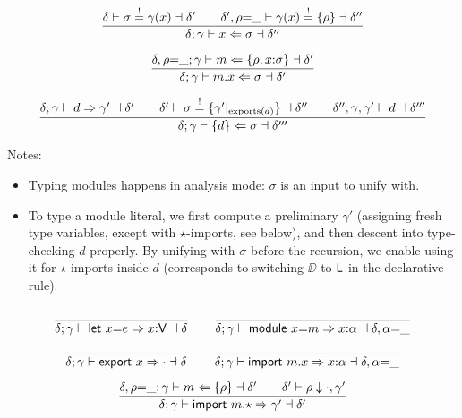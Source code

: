 \documentclass[10pt,a4paper]{article}
\newcommand\ff[1]{\ensuremath{\mathbin{\mathrm{#1\null}}}\xspace}
\newcommand\y[1]{\ensuremath{\mathsf{#1}}\xspace}
\newcommand\K[1]{\ensuremath{\textsf{#1}}}
\newcommand\note[1]{\noindent #1}
\begin{document}
\subsubsection*{}

$$
\frac{
  \delta \vdash \sigma \stackrel!= \gamma(x) \dashv \delta'
  \qquad
  \delta',\rho{=}\_ \vdash \gamma(x) \stackrel!= \{\rho\} \dashv \delta''
}{
  \delta; \gamma \vdash x \Leftarrow \sigma \dashv \delta''
}
$$

$$
\frac{
  \delta,\rho{=}\_; \gamma \vdash m \anal \{\rho,x{:}\sigma\} \dashv \delta'
}{
  \delta; \gamma \vdash m\K.x \anal \sigma \dashv \delta'
}
$$

$$
\frac{
  \delta; \gamma \vdash d \synth \gamma' \dashv \delta'
  \qquad
  \delta' \vdash \sigma \makeeq \{\gamma'|_{\ff{exports}(d)}\} \dashv \delta''
  \qquad
  \delta''; \gamma,\gamma' \vdash d \dashv \delta'''
}{
  \delta; \gamma \vdash \{d\} \anal \sigma \dashv \delta'''
}
$$

\note{
Notes:
\begin{itemize}
\item Typing modules happens in analysis mode: $\sigma$ is an input to unify with.
\item To type a module literal, we first compute a preliminary $\gamma'$ (assigning fresh type variables, except with $\star$-imports, see below), and then descent into type-checking $d$ properly. By unifying with $\sigma$ before the recursion, we enable using it for $\star$-imports inside $d$ (corresponds to switching $\DD$ to $\LL$ in the declarative rule).
\end{itemize}
\clearpage
}


\subsubsection*{}

$$
\frac{
}{
  \delta; \gamma \vdash \K{let}~x\K=e \synth x{:}\y{V} \dashv \delta
}
\qquad
\frac{
}{
  \delta; \gamma \vdash \K{module}~x\K=m \synth x{:}\alpha \dashv \delta,\alpha{=}\_
}
$$

$$
\frac{
}{
  \delta; \gamma \vdash \K{export}~x \synth {\cdot} \dashv \delta
}
\qquad
\frac{
}{
  \delta; \gamma \vdash \K{import}~m\K.x \synth x{:}\alpha \dashv \delta,\alpha{=}\_
}
$$

$$
\frac{
  \delta,\rho{=}\_; \gamma \vdash m \anal \{\rho\} \dashv \delta'
  \qquad
  \delta' \vdash \rho \downarrow {\cdot},\gamma'
}{
  \delta; \gamma \vdash \K{import}~m\K.{\star} \synth \gamma' \dashv \delta'
}
$$
\end{document}
